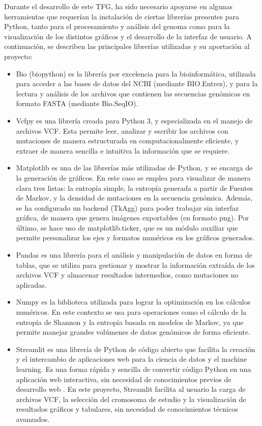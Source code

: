 \documentclass[11pt,spanish,listoffigures,listoftables]{tfgetsinf}
\begin{document}
Durante el desarrollo de este TFG, ha sido necesario apoyarse en algunas herramientas que requerían la instalación de ciertas librerías presentes para Python, tanto para el procesamiento y análisis del genoma como para la visualización de los distintos gráficos y el desarrollo de la interfaz de usuario. A continuación, se describen las principales librerías utilizadas y su aportación al proyecto:

\begin{itemize}
   \item Bio (biopython) es la librería por excelencia para la bioinformática, utilizada para acceder a las bases de datos del NCBI (mediante BIO.Entrez), y para la lectura y análisis de los archivos que contienen las secuencias genómicas en formato FASTA (mediante Bio.SeqIO).
   \item Vcfpy es una librería creada para Python 3, y especializada en el manejo de archivos VCF. Esta permite leer, analizar y escribir los archivos con mutaciones de manera estructurada en computacionalmente eficiente, y extraer de manera sencilla e intuitiva la información que se requiere.
   \item Matplotlib es una de las librerías más utilizadas de Python, y se encarga de la generación de gráficos. En este caso se emplea para visualizar de manera clara tres listas: la entropía simple, la entropía generada a partir de Fuentes de Markov, y la densidad de mutaciones en la secuencia genómica. Además, se ha configurado un backend (TkAgg) para poder trabajar sin interfaz gráfica, de manera que genera imágenes exportables (en formato png). Por último, se hace uso de matplotlib.ticker, que es un módulo auxiliar que permite personalizar los ejes y formatos numéricos en los gráficos generados.
   \item Pandas es una librería para el análisis y manipulación de datos en forma de tablas, que se utiliza para gestionar y mostrar la información extraída de los archivos VCF y almacenar resultados intermedios, como mutaciones no aplicadas.
   \item Numpy es la biblioteca utilizada para lograr la optimización en los cálculos numéricos. En este contexto se usa para operaciones como el cálculo de la entropía de Shannon y la entropía basada en modelos de Markov, ya que permite manejar grandes volúmenes de datos genómicos de forma eficiente.
   \item Streamlit es una librería de Python de código abierto que facilita la creación y el intercambio de aplicaciones web para la ciencia de datos y el machine learning. Es una forma rápida y sencilla de convertir código Python en una aplicación web interactiva, sin necesidad de conocimientos previos de desarrollo web . En este proyecto, Streamlit facilita al usuario la carga de archivos VCF, la selección del cromosoma de estudio y la visualización de resultados gráficos y tabulares, sin necesidad de conocimientos técnicos avanzados.
\end{itemize}
\end{document}
